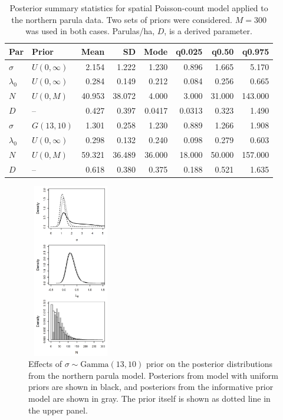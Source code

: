 \begin{table}%
  \caption{Posterior summary statistics for spatial Poisson-count
    model applied to the northern parula data. Two sets of priors were
    considered. $M=300$ was used in both cases. Parulas/ha, $D$, is a
    derived parameter.}
  \scriptsize
  \begin{tabular}{l l rrrrrr}
    \hline
    Par        & Prior                  & Mean  & SD    & Mode   & q0.025  & q0.50  & q0.975  \\
    \hline
    $\sigma$   & $U(0, \infty)$   & 2.154   & 1.222  & 1.230   & 0.896   & 1.665   & 5.170    \\
    $\lambda_0$ & $U(0, \infty)$  & 0.284   & 0.149 & 0.212    & 0.084  & 0.256  & 0.665   \\
    $N$        & $U(0, M)$             & 40.953   & 38.072  & 4.000  & 3.000       & 31.000     & 143.000     \\
    $D$        &  --                   & 0.427    & 0.397 & 0.0417   & 0.0313  & 0.323  & 1.490    \\
    \hline
    $\sigma$    & $G(13, 10)$          & 1.301    & 0.258 & 1.230    & 0.889   & 1.266   & 1.908    \\
    $\lambda_0$ & $U(0, \infty)$ & 0.298    & 0.132 & 0.240    & 0.098   & 0.279  & 0.603   \\
    $N$         & $U(0, M)$            & 59.321   & 36.489  & 36.000 & 18.000      & 50.000     & 157.000     \\
    $D$         &  --                  & 0.618    & 0.380 & 0.375   & 0.188   & 0.521  & 1.635    \\
    \hline
  \end{tabular}
  \label{t:nopaPosts}
\vspace{0.5cm}
\end{table}



\begin{figure}
  \centering
  \includegraphics[width=1.5in,height=3in]{Ch14/figs/prior} %
  \caption{Effects of $\sigma \sim \mbox{Gamma}(13,10)$
    prior on the posterior distributions from the northern parula
    model. Posteriors from model with uniform priors are
    shown in black, and posteriors from the informative prior model
    are shown in gray. The prior itself is shown as dotted line in the
    upper panel.}
  \label{fig:prior}
\end{figure}




